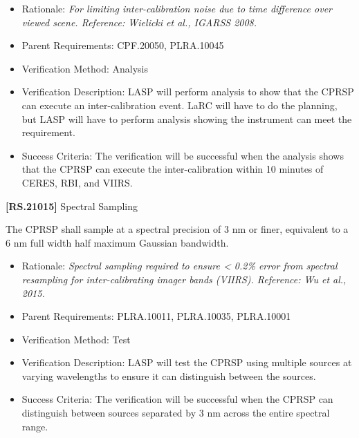 \begin{itemize}
\item{} Rationale: \emph{For limiting inter-calibration noise due to time difference over viewed scene. Reference: Wielicki et al., IGARSS 2008.}

\item{} Parent Requirements: \gls{CPF}.20050, PLRA.10045

\item{} Verification Method: Analysis

\item{} Verification Description: \gls{LASP} will perform \gls{analysis} to show that the \gls{CPRSP} can execute an inter-calibration event. \gls{LaRC} will have to do the planning, but \gls{LASP} will have to perform \gls{analysis} showing the instrument can meet the requirement.

\item{} Success Criteria: The verification will be successful when the \gls{analysis} shows that the \gls{CPRSP} can execute the inter-calibration within 10 minutes of \gls{CERES}, \gls{RBI}, and \gls{VIIRS}.

\end{itemize}

\textbf{[RS.21015]} Spectral Sampling

The \gls{CPRSP} shall \gls{sample} at a spectral precision of 3 nm or finer, equivalent to a 6 nm full width half maximum Gaussian bandwidth.

\begin{itemize}
\item{} Rationale: \emph{Spectral sampling required to ensure < 0.2\% error from spectral resampling for inter-calibrating imager bands (VIIRS). Reference: Wu et al., 2015.}

\item{} Parent Requirements: PLRA.10011, PLRA.10035, PLRA.10001

\item{} Verification Method: Test

\item{} Verification Description: \gls{LASP} will \gls{test} the \gls{CPRSP} using multiple sources at varying wavelengths to ensure it can distinguish between the sources.

\item{} Success Criteria: The verification will be successful when the \gls{CPRSP} can distinguish between sources separated by 3 nm across the entire spectral range.

\end{itemize}

